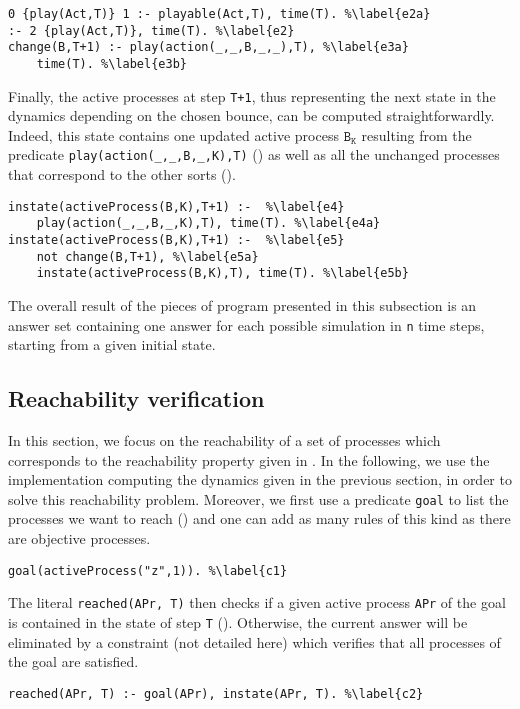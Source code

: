 \begin{lstlisting}
0 {play(Act,T)} 1 :- playable(Act,T), time(T). %\label{e2a}
:- 2 {play(Act,T)}, time(T). %\label{e2}
change(B,T+1) :- play(action(_,_,B,_,_),T), %\label{e3a}
	time(T). %\label{e3b}
\end{lstlisting}

Finally, the active processes at step \texttt{T+1},
thus representing the next state in the dynamics depending on the chosen bounce,
can be computed straightforwardly.
Indeed, this state contains one updated active process $\texttt{B}_\texttt{K}$
resulting from the predicate \texttt{play(action(\_,\_,B,\_,K),T)} ()
as well as all the unchanged processes that correspond to the other sorts ().
\begin{lstlisting}
instate(activeProcess(B,K),T+1) :-  %\label{e4}
	play(action(_,_,B,_,K),T), time(T). %\label{e4a}
instate(activeProcess(B,K),T+1) :-  %\label{e5}
	not change(B,T+1), %\label{e5a}
	instate(activeProcess(B,K),T), time(T). %\label{e5b}
\end{lstlisting}

The overall result of the pieces of program presented in this subsection
is an answer set containing one answer for each
possible simulation in \texttt{n} time steps,
starting from a given initial state.

\subsection{Reachability verification}
In this section, we focus on the reachability of a set of processes which corresponds to the reachability property given in .
In the following, we use the implementation computing the dynamics given in the previous section, in order to solve this reachability problem.
Moreover, we first use a predicate \texttt{goal} to list the processes we want to reach () and one can add as many rules of this kind as there are objective processes.
\begin{lstlisting}
goal(activeProcess("z",1)). %\label{c1}
\end{lstlisting}
The literal \texttt{reached(APr, T)} then
checks if a given active process \texttt{APr} of the goal
is contained in the state of step \texttt{T} ().
Otherwise, the current answer will be eliminated by a constraint (not detailed here) which verifies that all processes of the goal are satisfied.
\begin{lstlisting}
reached(APr, T) :- goal(APr), instate(APr, T). %\label{c2}
\end{lstlisting}

